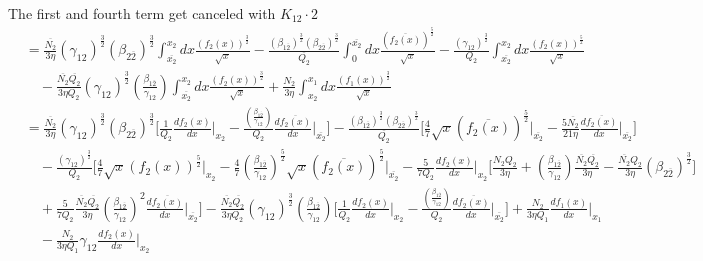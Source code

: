 \documentclass[fleqn, 10pt]{article}
\begin{document}
            The first and fourth term get canceled with $K_{12} \cdot 2$ 
            \begin{equation*}
            \begin{split}
            &= \frac{\overline{N_2}}{3\eta}(\gamma_{12})^\frac{3}{2} (\beta_{2\overline{2}})^\frac{3}{2} \int^{x_2}_{\overline{x_2}} dx \frac{(f_2(x))^\frac{3}{2}}{\sqrt{x}} - \frac{(\beta_{1\overline{2}})^\frac{3}{2} (\beta_{2\overline{2}})^\frac{3}{2}}{\overline{Q_2}} \int^{\overline{x_2}}_0 dx \frac{(\overline{f_2(x)})^\frac{5}{2}}{\sqrt{x}} - \frac{(\gamma_{12})^\frac{3}{2}}{Q_2} \int^{x_2}_{\overline{x_2}} dx \frac{(f_2(x))^\frac{5}{2}}{\sqrt{x}} \\ & \quad - \frac{\overline{N_2}\overline{Q_2}}{3 \eta Q_2} (\gamma_{12})^\frac{3}{2} \left(\frac{\beta_{1\overline{2}}}{\gamma_{12}}\right) \int^{x_2}_{\overline{x_2}} dx \frac{(f_2(x))^\frac{3}{2}}{\sqrt{x}}  + \frac{N_2}{3 \eta} \int^{x_1}_{x_2} dx \frac{(f_1(x))^\frac{3}{2}}{\sqrt{x}}
            \end{split}
            \end{equation*}
            \begin{equation}
            \begin{split}
            &=   \frac{\overline{N_2}}{3 \eta} (\gamma_{12})^\frac{3}{2} (\beta_{2\overline{2}})^\frac{3}{2} \Biggl[ \frac{1}{Q_2} \frac{df_2(x)}{dx} \Bigg|_{x_2} -   \frac{\left(\frac{\beta_{1\overline{2}}}{\gamma_{12}}\right)}{Q_2} \frac{d\overline{f_2(x)}}{dx} \Bigg|_{\overline{x_2}} \Biggr] -  \frac{(\beta_{1\overline{2}})^\frac{3}{2}(\beta_{2\overline{2}})^\frac{3}{2}}{\overline{Q_2}} \Biggl[ \frac{4}{7} \sqrt{x} (\overline{f_2(x)})^\frac{5}{2} \Bigg|_{\overline{x_2}} -  \frac{5 \overline{N_2}}{21 \eta} \frac{d\overline{f_2(x)}}{dx} \Bigg|_{\overline{x_2}} \Biggr] \\ & \quad -   \frac{(\gamma_{12})^\frac{3}{2}}{Q_2} \Biggl[ \frac{4}{7} \sqrt{x} (f_2(x))^\frac{5}{2} \Bigg|_{x_2} -   \frac{4}{7} \left(\frac{\beta_{1\overline{2}}}{\gamma_{12}}\right)^\frac{5}{2} \sqrt{x} (\overline{f_2(x)})^\frac{5}{2} \Bigg|_{\overline{x_2}} -   \frac{5}{7 Q_2} \frac{df_2(x)}{dx} \Bigg|_{x_2} \Biggl[\frac{N_2 Q_2}{3 \eta} + \left(\frac{\beta_{1\overline{2}}}{\gamma_{12}}\right) \frac{\overline{N_2}\overline{Q_2}}{3 \eta} - \frac{\overline{N_2}Q_2}{3 \eta} (\beta_{2\overline{2}})^\frac{3}{2} \Biggr] \\ & \quad +   \frac{5}{7Q_2} \frac{\overline{N_2}\overline{Q_2}}{3 \eta} \left(\frac{\beta_{1\overline{2}}}{\gamma_{12}}\right)^2 \frac{d\overline{f_2(x)}}{dx}\Bigg|_{\overline{x_2}} \Biggr] -   \frac{\overline{N_2}\overline{Q_2}}{3\eta Q_2} (\gamma_{12})^\frac{3}{2} \left(\frac{\beta_{1\overline{2}}}{\gamma_{12}}\right) \Biggl[ \frac{1}{Q_2} \frac{df_2(x)}{dx}\Bigg|_{x_2} -   \frac{\left(\frac{\beta_{1\overline{2}}}{\gamma_{12}}\right)}{Q_2} \frac{d\overline{f_2(x)}}{dx}\Bigg|_{\overline{x_2}} \Biggr] +   \frac{N_2}{3 \eta Q_1} \frac{df_1(x)}{dx} \Bigg|_{x_1} \\ & \quad -  \frac{N_2}{3 \eta Q_1} \gamma_{12} \frac{df_2(x)}{dx}\Bigg|_{x_2}
            \label{72}
            \end{split}
            \end{equation} 
\end{document}
